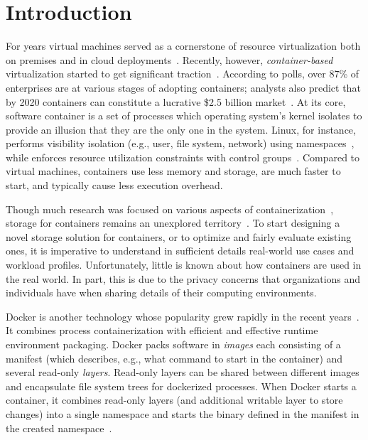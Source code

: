 \section{Introduction}

For years virtual machines served as a cornerstone of resource virtualization
both on premises and in cloud deployments~\cite{rosenblum2005virtual}.
%
Recently, however, \emph{container-based} virtualization started to get
significant traction~\cite{process-containers-linux}.
%
According to polls, over 87\% of enterprises are at various stages of adopting
containers; analysts also predict that by 2020 containers can constitute a
lucrative \$2.5 billion market~\cite{container-grow-by2020}.
%
At its core, software container is a set of processes which operating system's
kernel isolates to provide an illusion that they
are the only one in the system.
%
Linux, for instance, performs visibility isolation (e.g., user, file system,
network) using namespaces~\cite{man-namespaces}, while enforces resource
utilization constraints with control groups~\cite{kernel-doc-cgroups}.
%
Compared to virtual machines, containers use less memory and storage, are much
faster to start, and typically cause less execution overhead.



Though much research was focused on various aspects of
containerization~, storage for containers remains an unexplored
territory~\cite{login-container-storage-options}.
%
To start designing a novel storage solution for containers, or to optimize and
fairly evaluate existing ones, it is imperative to understand in sufficient
details  real-world use cases and workload profiles.
%
Unfortunately, little is known about how containers are used in the real world.
%
In part, this is due to the privacy concerns that organizations and individuals
have when sharing details of their computing environments.



Docker is another technology whose popularity grew rapidly in the recent
years~\cite{docker}.
%
It combines process containerization with efficient and effective runtime
environment packaging.
%
Docker packs software in \emph{images} each consisting of a manifest (which
describes, e.g., what command to start in the container) and several read-only
\emph{layers}.
%
Read-only layers can be shared between different images and encapsulate file
system trees for dockerized processes.
%
When Docker starts a container, it combines read-only layers (and additional
writable layer to store changes) into a single namespace and starts the binary
defined in the manifest in the created namespace~\cite{docker-driver-eval}.



